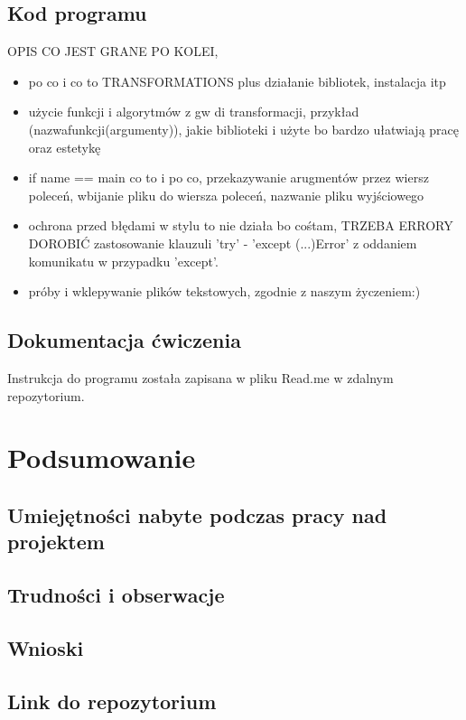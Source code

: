 \documentclass[10pt,a4paper]{article}
\begin{document}
\subsection{Kod programu}
OPIS CO JEST GRANE PO KOLEI, 
\begin{itemize}
	\item po co i co to TRANSFORMATIONS plus działanie bibliotek, instalacja itp
	\item użycie funkcji i algorytmów z gw di transformacji, przykład (nazwafunkcji(argumenty)), jakie biblioteki i użyte bo bardzo ułatwiają pracę oraz estetykę 
	\item {if name == main} co to i po co, przekazywanie arugmentów przez wiersz poleceń, wbijanie pliku do wiersza poleceń, nazwanie pliku wyjściowego
	\item ochrona przed błędami w stylu to nie działa bo cośtam, TRZEBA ERRORY DOROBIĆ zastosowanie klauzuli 'try' - 'except (...)Error' z oddaniem komunikatu w przypadku 'except'. 
	\item próby i wklepywanie plików tekstowych, zgodnie z naszym życzeniem:)
\end{itemize}
\subsection{Dokumentacja ćwiczenia}
Instrukcja do programu została zapisana w pliku Read.me w zdalnym repozytorium.
\section{Podsumowanie}
\subsection{Umiejętności nabyte podczas pracy nad projektem}
\subsection{Trudności i obserwacje}
\subsection{Wnioski}
\subsection{Link do repozytorium}
\end{document}
